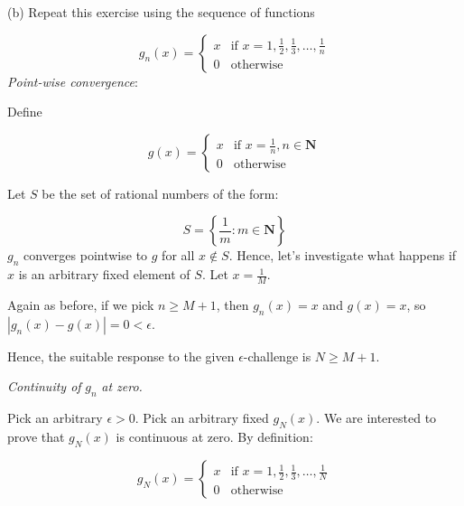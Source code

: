 \documentclass[10pt]{article}
\begin{document}
(b) Repeat this exercise using the sequence of functions


\begin{equation*}
g_{n}( x) =\begin{cases}
x & \text{if } x=1,\frac{1}{2} ,\frac{1}{3} ,\dotsc ,\frac{1}{n}\\
0 & \text{otherwise}
\end{cases}
\end{equation*}
\textit{Point-wise convergence}:



Define 


\begin{equation*}
g( x) =\begin{cases}
x & \text{if } x=\frac{1}{n} ,n\in \mathbf{N}\\
0 & \text{otherwise}
\end{cases}
\end{equation*}


Let $\displaystyle S$ be the set of rational numbers of the form:


\begin{equation*}
S=\left\{\frac{1}{m} :m\in \mathbf{N}\right\}
\end{equation*}
$\displaystyle g_{n}$ converges pointwise to $\displaystyle g$ for all $\displaystyle x\notin S$. Hence, let's investigate what happens if $\displaystyle x$ is an arbitrary fixed element of $\displaystyle S$. Let $\displaystyle x=\frac{1}{M}$. 



Again as before, if we pick $\displaystyle n\geq M+1$, then $\displaystyle g_{n}( x) =x$ and $\displaystyle g( x) =x$, so $\displaystyle |g_{n}( x) -g( x) |=0< \epsilon $. 



Hence, the suitable response to the given $\displaystyle \epsilon $-challenge is $\displaystyle N\geq M+1$.



\textit{Continuity of }$\displaystyle g_{n}$\textit{ at zero.}



Pick an arbitrary $\displaystyle \epsilon  >0$. Pick an arbitrary fixed $\displaystyle g_{N}( x)$. We are interested to prove that $\displaystyle g_{N}( x)$ is continuous at zero. By definition:


\begin{equation*}
g_{N}( x) =\begin{cases}
x & \text{if } x=1,\frac{1}{2} ,\frac{1}{3} ,\dotsc ,\frac{1}{N}\\
0 & \text{otherwise}
\end{cases}
\end{equation*}
\end{document}
